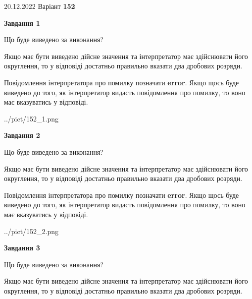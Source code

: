 \documentclass[12pt, ukrainian]{article}
\begin{document}
{20.12.2022 Варіант \No \textbf { 152 }\par}
{
\begin {Large}

{\begin {center}\textbf{Завдання 1}\end {center}}\par
Що буде виведено за виконання? \par

Якщо має бути виведено дійсне значення та інтерпретатор має здійснювати його округлення, 
то у відповіді достатньо правильно вказати два дробових розряди.

Повідомлення інтерпретатора про помилку позначати \textbf{error}.
Якщо щось буде виведено до того, як інтерпретатор видасть повідомлення про помилку, 
то воно має вказуватись у відповіді. \par

\begin{center}
	{../pict/152_1.png}
\end{center}
\newpage

{\begin {center}\textbf{Завдання 2}\end {center}}\par
Що буде виведено за виконання? \par

Якщо має бути виведено дійсне значення та інтерпретатор має здійснювати його округлення, 
то у відповіді достатньо правильно вказати два дробових розряди.

Повідомлення інтерпретатора про помилку позначати \textbf{error}.
Якщо щось буде виведено до того, як інтерпретатор видасть повідомлення про помилку, 
то воно має вказуватись у відповіді. \par

\begin{center}
	{../pict/152_2.png}
\end{center}
\newpage

{\begin {center}\textbf{Завдання 3}\end {center}}\par
Що буде виведено за виконання? \par

Якщо має бути виведено дійсне значення та інтерпретатор має здійснювати його округлення, 
то у відповіді достатньо правильно вказати два дробових розряди.


\end{Large}}
\end{document}
